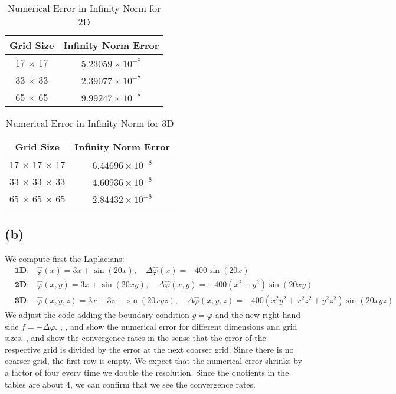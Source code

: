 \begin{table}[h!]
\centering
\begin{tabular}{|c|c|}
\hline
\textbf{Grid Size} & \textbf{Infinity Norm Error} \\
\hline
17 $\times$ 17 & $5.23059 \times 10^{-8}$ \\
\hline
33 $\times$ 33 & $2.39077 \times 10^{-7}$ \\
\hline
65 $\times$ 65 & $9.99247 \times 10^{-8}$ \\
\hline
\end{tabular}
\caption{Numerical Error in Infinity Norm for 2D}
\label{2D_err}
\end{table}

\begin{table}[h!]
\centering
\begin{tabular}{|c|c|}
\hline
\textbf{Grid Size} & \textbf{Infinity Norm Error} \\
\hline
17 $\times$ 17 $\times$ 17 & $6.44696 \times 10^{-8}$ \\
\hline
33 $\times$ 33 $\times$ 33 & $4.60936 \times 10^{-8}$ \\
\hline
65 $\times$ 65 $\times$ 65 & $2.84432 \times 10^{-8}$ \\
\hline
\end{tabular}
\caption{Numerical Error in Infinity Norm for 3D}
\label{3D_err}
\end{table}
\FloatBarrier

\subsection*{(b)}
\FloatBarrier
We compute first the Laplacians:
\begin{align*}
&\textbf{1D:} \quad \hat{\varphi}(x) = 3x + \sin(20x), \quad \Delta \hat{\varphi}(x) = -400\sin(20x) \\
&\textbf{2D:} \quad \hat{\varphi}(x, y) = 3x + \sin(20xy), \quad \Delta \hat{\varphi}(x, y) = -400(x^2 + y^2)\sin(20xy) \\
&\textbf{3D:} \quad \hat{\varphi}(x, y, z) = 3x + 3z + \sin(20xyz), \quad \Delta \hat{\varphi}(x, y, z) = -400(x^2y^2 + x^2z^2 + y^2z^2)\sin(20xyz)
\end{align*}
We adjust the code adding the boundary condition $g=\varphi$ and the new right-hand side $f = -\Delta \varphi$. , , and  show the numerical error for different dimensions and grid sizes. , and  show the convergence rates in the sense that the error of the respective grid is divided by the error at the next coarser grid. Since there is no coarser grid, the first row is empty. We expect that the numerical error shrinks by a factor of four every time we double the resolution. Since the quotients in the tables are about 4, we can confirm that we see the convergence rates.


